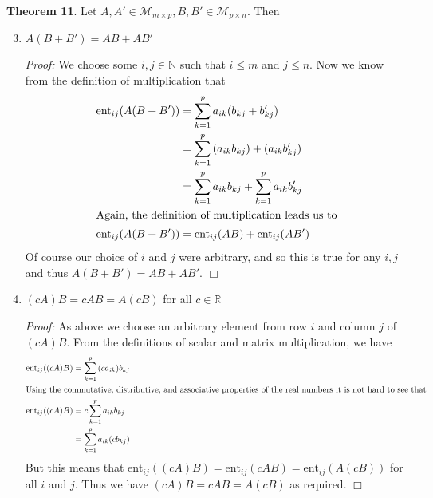 \documentclass[letterpaper]{article}
\begin{document}
\renewcommand{\labelenumii}{\alph{enumii}.}
\renewcommand{\labelenumiii}{\alph{enumiii}.}
\renewcommand{\labelenumi}{(\arabic{enumi})}
\begin{description}
\item \textbf{Theorem 11}.
Let $A,A'\in \mathcal{M}_{m\times p},B,B'\in\mathcal{M}_{p\times n}$. Then
\begin{enumerate}
\setcounter{enumi}{2}
\item
$A(B+B')=AB+AB'$

\emph{Proof:}
We choose some $i,j\in \mathbb{N}$ such that $i\le m$ and $j\le n$. Now we know from the definition of multiplication that
\begin{align*}
  \text{ent}_{ij}(A(B+B'))&=\sum\limits_{k=1}^{p}{a_{ik}(b_{kj}+b_{kj}')}\\
  &=\sum\limits_{k=1}^{p}{(a_{ik}b_{kj})+(a_{ik}b_{kj}')}\\
  &=\sum\limits_{k=1}^{p}{a_{ik}b_{kj}}+\sum\limits_{k=1}^{p}{a_{ik}b_{kj}'}\\
  \intertext{Again, the definition of multiplication leads us to}
  \text{ent}_{ij}(A(B+B'))&=\text{ent}_{ij}(AB)+\text{ent}_{ij}(AB')
\end{align*}
Of course our choice of $i$ and $j$ were arbitrary, and so this is true for any $i,j$ and thus $A(B+B')=AB+AB'$.
$\Box$
\item
$(cA)B=cAB=A(cB)$ for all $c\in \mathbb{R}$

\emph{Proof:}
As above we choose an arbitrary element from row $i$ and column $j$ of $(cA)B$.
From the definitions of scalar and matrix multiplication, we have
\begin{align*}
  \text{ent}_{ij}((cA)B)&=\sum\limits_{k=1}^{p}{(ca_{ik})b_{kj}}\\
  \intertext{Using the commutative, distributive, and associative properties of the real numbers it is not hard to see that}
  \text{ent}_{ij}((cA)B)&=c\sum\limits_{k=1}^{p}{a_{ik}b_{kj}}\\
  &=\sum\limits_{k=1}^{p}{a_{ik}(cb_{kj})}\\
\end{align*}
But this means that $\text{ent}_{ij}((cA)B)=\text{ent}_{ij}(cAB)=\text{ent}_{ij}(A(cB))$ for all $i$ and $j$. Thus we have $(cA)B=cAB=A(cB)$ as required.
$\Box$
\end{enumerate}
\end{description}
\renewcommand{\labelenumi}{2.1.\arabic{enumi}}
\end{document}
